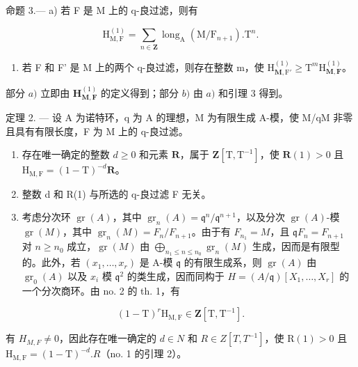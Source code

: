 命题 3.--- a) 若 F 是 M 上的 q-良过滤，则有

\[
\mathrm{H} _ {\mathrm{M}, \mathrm{F}} ^ {(1)} = \sum_ {n \in \mathbf {Z}} \operatorname{long} _ {\mathrm{A}} (\mathrm{M} / \mathrm{F} _ {n + 1}). \mathrm{T} ^ {n}.\tag{10}
\]

\begin{enumerate}
\def\labelenumi{\alph{enumi})}
\setcounter{enumi}{1}
\tightlist
\item
  若 F 和 F' 是 M 上的两个 q-良过滤，则存在整数 m，使 \(\mathrm{H}_{\mathbf{M},\mathrm{F}'}^{(1)} \geqslant \mathrm{T}^{m}\mathrm{H}_{\mathbf{M},\mathbf{F}}^{(1)}\)。
\end{enumerate}

部分 \(a)\) 立即由 \(\mathbf{H}_{\mathbf{M},\mathbf{F}}^{(1)}\) 的定义得到；部分 \(b)\) 由 \(a)\) 和引理 3 得到。

定理 2. --- 设 A 为诺特环，q 为 A 的理想，M 为有限生成 A-模，使 M/qM 非零且具有有限长度，F 为 M 上的 q-良过滤。

\begin{enumerate}
\def\labelenumi{\alph{enumi})}
\item
  存在唯一确定的整数 \(d \geqslant 0\) 和元素 \(\mathbf{R}\)，属于 \(\mathbf{Z}[\mathrm{T}, \mathrm{T}^{-1}]\)，使 \(\mathbf{R}(1) > 0\) 且 \(\mathrm{H}_{\mathrm{M,F}} = (1 - \mathrm{T})^{-d}\mathbf{R}\)。
\item
  整数 d 和 R(1) 与所选的 q-良过滤 F 无关。
\item
  考虑分次环 \(\operatorname{gr}(A)\)，其中 \(\operatorname{gr}_{n}(A) = \mathfrak{q}^{n}/\mathfrak{q}^{n+1}\)，以及分次 \(\operatorname{gr}(A)\)-模 \(\operatorname{gr}(M)\)，其中 \(\operatorname{gr}_{n}(M) = F_{n}/F_{n+1}\)。由于有 \(F_{n_{1}} = M\)，且 \(\mathfrak{q}F_{n} = F_{n+1}\) 对 \(n \geqslant n_{0}\) 成立，\(\operatorname{gr}(M)\) 由 \(\bigoplus_{n_{1} \leqslant n \leqslant n_{0}} \operatorname{gr}_{n}(M)\) 生成，因而是有限型的。此外，若 \((x_{1},\ldots,x_{r})\) 是 A-模 \(\mathfrak{q}\) 的有限生成系，则 \(\operatorname{gr}(A)\) 由 \(\operatorname{gr}_{0}(A)\) 以及 \(x_{i}\) 模 \(\mathfrak{q}^{2}\) 的类生成，因而同构于 \(H = (A/\mathfrak{q})[X_{1},\ldots,X_{r}]\) 的一个分次商环。由 no. 2 的 th. 1，有
\end{enumerate}

\[
(1 - \mathrm{T}) ^ {r} \mathrm{H} _ {\mathrm{M}, \mathrm{F}} \in \mathbf {Z} [ \mathrm{T}, \mathrm{T} ^ {- 1} ].
\]

有 \(H_{M,F} \neq 0\)，因此存在唯一确定的 \(d \in N\) 和 \(R \in Z[T, T^{-1}]\)，使 \(\mathrm{R}(1) > 0\) 且 \(\mathrm{H}_{\mathrm{M},\mathrm{F}} = (1 - \mathrm{T})^{-d}. R\)（no. 1 的引理 2）。

